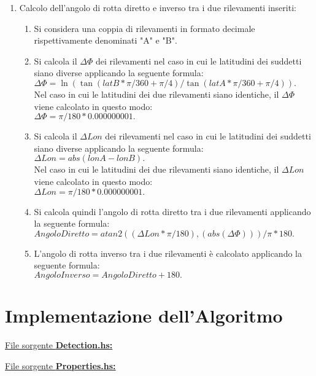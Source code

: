 \documentclass{article}
\begin{document}
\begin{enumerate}
	\item  Calcolo dell'angolo di rotta diretto e inverso tra i due rilevamenti inseriti:
	\begin{enumerate}
		\item  Si considera una coppia di rilevamenti in formato decimale rispettivamente denominati "A" e "B".
		\item Si calcola il $\Delta\Phi$ dei rilevamenti nel caso in cui le latitudini dei suddetti siano diverse applicando la seguente formula:\\ $\Delta\Phi = \ln( \tan(latB * \pi / 360 + \pi / 4 ) / \tan(latA * \pi / 360 + \pi / 4 )). $\\
		Nel caso in cui le latitudini dei due rilevamenti siano identiche, il $\Delta\Phi$ viene calcolato in questo modo:\\ $\Delta\Phi = \pi / 180 * 0.000000001.$
		\item Si calcola il $\Delta Lon$ dei rilevamenti nel caso in cui le latitudini dei suddetti siano diverse applicando la seguente formula:\\ $ \Delta Lon = abs(lonA - lonB). $\\
		Nel caso in cui le latitudini dei due rilevamenti siano identiche, il $\Delta Lon$ viene calcolato in questo modo:\\ $\Delta Lon = \pi / 180 * 0.000000001.$
		\item Si calcola quindi l'angolo di rotta diretto tra i due rilevamenti applicando la seguente formula:\\ $ Angolo Diretto = atan2((\Delta Lon * \pi / 180), (abs(\Delta\Phi))) / \pi * 180.$\\
		\item L'angolo di rotta inverso tra i due rilevamenti è calcolato applicando la seguente formula: \\ $ Angolo Inverso = Angolo Diretto + 180.$\\
	\end{enumerate}

\end{enumerate}
\newpage

\section{Implementazione dell'Algoritmo}
\raggedright
\underline{File sorgente \textbf{Detection.hs:}}


\underline{File sorgente \textbf{Properties.hs:}}

\end{document}
